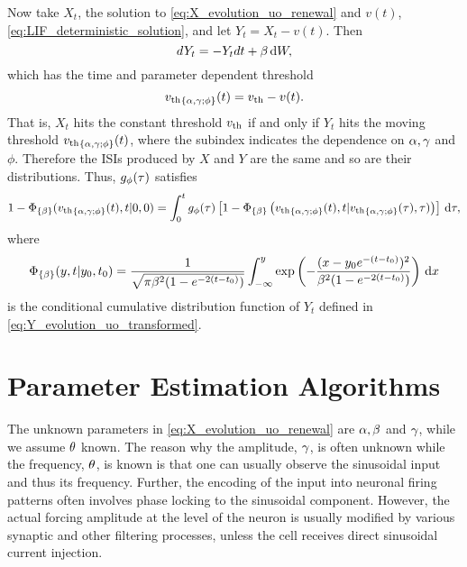 Now take $X_t$, the solution to \cref{eq:X_evolution_uo_renewal} and
$v(t)$, \cref{eq:LIF_deterministic_solution}, and 
let $Y_t = X_t - v(t)$. Then
\begin{equation}
dY_t = -Y_t dt + \beta \, \mathrm{d} W,
\label{eq:Y_evolution_uo_transformed}
\end{equation}
which has the time and parameter dependent threshold
\begin{equation}
{ v_{\textrm{th} } }_{\{\alpha,{\gamma };\phi\}}(t) = { v_{\textrm{th} } } - v(t).
\end{equation}
That is, $X_t$ hits the constant threshold ${ v_{\textrm{th} } }$ if and only if $Y_t$ hits the
moving threshold ${ v_{\textrm{th} } }_{\{\alpha,{\gamma };\phi\}}(t)$, where the subindex
indicates the dependence on $\alpha,{\gamma }$ and $\phi$. Therefore the ISIs produced by $X$ and $Y$
are the same and so are their distributions. Thus, $g_\phi({\tau})$ satisfies
\begin{equation}
1 - {\Phi}_{\{\beta\}}({ v_{\textrm{th} } }_{\{\alpha,{\gamma };\phi\}} (t), t|0, 0) =
\int_0^t g_{\phi} (\tau)
\left[1-{\Phi}_{\{\beta\}} \left({ v_{\textrm{th} } }_{\{\alpha,{\gamma };\phi\}} (t),  t|
						  { v_{\textrm{th} } }_{\{\alpha,{\gamma };\phi\}} ({\tau}), {\tau} ) \right)
      \right] \, \mathrm{d} {\tau},
\label{eq:Fortet_moving_vth}
\end{equation}
where 
$$
{\Phi}_{\{\beta\}}(y,t| y_0, t_0) = \frac{1}{ \sqrt{\pi \beta^2(1-e^{-2(t-t_0)}) }}
\int_{-\infty}^{y} \exp \left( -\frac{(x - y_0e^{-(t-t_0)})^2}
							         {\beta^2(1-e^{-2(t-t_0)})} \right) \, \mathrm{d} x
$$
is the conditional cumulative distribution function of $Y_t$ defined in
\cref{eq:Y_evolution_uo_transformed}.

\section{Parameter Estimation Algorithms}
\label{sec:estimation_algos}
The unknown parameters in \cref{eq:X_evolution_uo_renewal} are $\alpha,\beta$ and ${\gamma }$,
while we assume ${ \theta}$ known. The reason why the amplitude, ${\gamma }$, is often
unknown while the frequency, ${ \theta}$, is known is that one can usually observe the
sinusoidal input and thus its frequency. Further, the encoding of the input into
neuronal firing patterns often involves phase locking to the sinusoidal
component. However, the actual forcing amplitude at the level of the neuron is
usually modified by various synaptic and other filtering processes, unless the
cell receives direct sinusoidal current injection.

